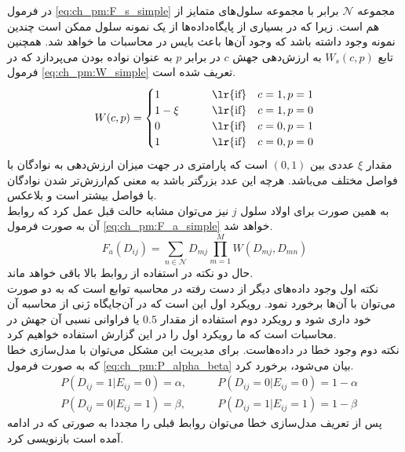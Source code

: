 در فرمول \ref{eq:ch_pm:F_s_simple} مجموعه $\mathcal{N}$ برابر با مجموعه سلول‌های متمایز از هم است. زیرا که در بسیاری از پایگاه‌داده‌ها از یک نمونه سلول ممکن است چندین نمونه وجود داشته باشد که وجود آن‌ها باعث بایس در محاسبات ما خواهد شد. همچنین تابع $W_s(c,p)$ به ارزش‌دهی جهش $c$ در برابر $p$ به عنوان نواده بودن می‌پردازد که در فرمول \ref{eq:ch_pm:W_simple} تعریف شده است.
\begin{equation}
	W(c, p) = 
	\begin{cases}
		1 	       &\qquad \text{\lr{if}} \quad c=1, p=1 \\
		1-\xi   &\qquad \text{\lr{if}} \quad c=1, p=0 \\
		0 		  &\qquad \text{\lr{if}} \quad c=0, p=1 \\
		1 	 	  &\qquad \text{\lr{if}} \quad c=0, p=0
	\end{cases}
	\label{eq:ch_pm:W_simple}
\end{equation}
مقدار $\xi$ عددی بین $(0,1)$ است که پارامتری در جهت میزان ارزش‌دهی به نوادگان با فواصل مختلف می‌باشد. هرچه این عدد بزرگتر باشد به معنی کم‌ارزش‌تر شدن نوادگان با فواصل بیشتر است و بلاعکس.
\\
به همین صورت برای اولاد سلول $j$ نیز می‌توان مشابه حالت قبل عمل کرد که روابط آن به صورت فرمول‌ \ref{eq:ch_pm:F_a_simple} خواهد شد.
\begin{equation}
	F_a(D_{ij}) = \sum_{n \in \mathcal{N}}  D_{mj}  \prod_{m=1}^{M} W(D_{mj}, D_{mn})
	\label{eq:ch_pm:F_a_simple}
\end{equation}
حال دو نکته در استفاده از روابط بالا باقی خواهد ماند. 
\\
نکته اول وجود داده‌های دیگر از دست رفته در محاسبه توابع است که به دو صورت می‌توان با آن‌ها برخورد  نمود. رویکرد اول این است که در آن‌جایگاه ژنی از محاسبه آن خود داری شود و رویکرد دوم استفاده از مقدار $0.5$ یا فراوانی نسبی آن جهش در محاسبات است که ما رویکرد اول را در این گزارش استفاده خواهیم کرد.
\\
نکته دوم وجود خطا در داده‌هاست. برای مدیریت این مشکل می‌توان با مدل‌سازی خطا که به صورت فرمول \ref{eq:ch_pm:P_alpha_beta} بیان می‌شود، برخورد کرد.
\begin{equation}
	\begin{aligned}
		&P(D_{ij}=1|E_{ij}=0)=\alpha, &\qquad P(D_{ij}=0|E_{ij}=0)=1-\alpha \\ &P(D_{ij}=0|E_{ij}=1)=\beta, &\qquad P(D_{ij}=1|E_{ij}=1)=1-\beta
	\end{aligned}
	\label{eq:ch_pm:P_alpha_beta}
\end{equation}
پس از تعریف مدل‌سازی خطا می‌توان روابط قبلی را مجددا به صورتی که در ادامه آمده است بازنویسی کرد.
